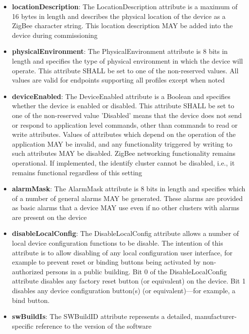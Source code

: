 \begin{itemize}
\item \textbf{locationDescription}: The LocationDescription attribute is a maximum of 16 bytes in length and describes the physical location of the device as a ZigBee character string. This location description MAY be added into the device during commissioning
\item \textbf{physicalEnvironment}: The PhysicalEnvironment attribute is 8 bits in length and specifies the type of physical environment in which the device will operate. This attribute SHALL be set to one of the non-reserved values. All values are valid for endpoints supporting all profiles except when noted
\item \textbf{deviceEnabled}: The DeviceEnabled attribute is a Boolean and specifies whether the device is enabled or disabled. This attribute SHALL be set to one of the non-reserved value 'Disabled' means that the device does not send or respond to application level commands, other than commands to read or write attributes. Values of attributes which depend on the operation of the application MAY be invalid, and any functionality triggered by writing to such attributes MAY be disabled. ZigBee networking functionality remains operational. If implemented, the identify cluster cannot be disabled, i.e., it remains functional regardless of this setting
\item \textbf{alarmMask}: The AlarmMask attribute is 8 bits in length and specifies which of a number of general alarms MAY be generated. These alarms are provided as basic alarms that a device MAY use even if no other clusters with alarms are present on the device
\item \textbf{disableLocalConfig}: The DisableLocalConfig attribute allows a number of local device configuration functions to be disable. The intention of this attribute is to allow disabling of any local configuration user interface, for example to prevent reset or binding buttons being activated by non-authorized persons in a public building. Bit 0 of the DisableLocalConfig attribute disables any factory reset button (or equivalent) on the device. Bit 1 disables any device configuration button(s) (or equivalent)—for example, a bind button.
\item \textbf{swBuildIs}: The SWBuildID attribute represents a detailed, manufacturer-specific reference to the version of the software
\end{itemize}


